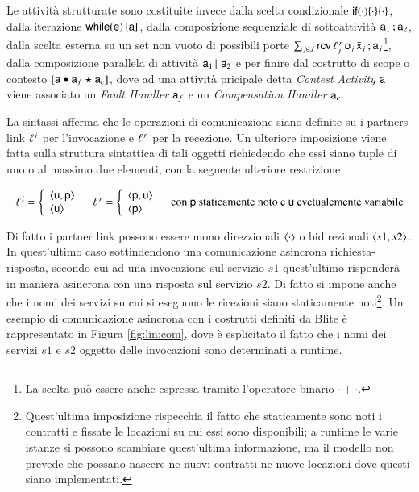 Le attività strutturate sono costituite invece dalla scelta condizionale
${\sf if}(\cdot)\{ \cdot \}\{\cdot\}$, dalla iterazione ${\sf while}({\sf e})\, \{ {\sf a}\}$, dalla
composizione sequenziale di sottoattività ${\sf a}_1\, ;{\sf a}_2$, dalla scelta
esterna su un set non vuoto di possibili porte $\sum_{j \in
J}{\sf rcv}\,\ell^{\,r}_j\, {\sf o}_j\, \bar{{\sf x}}_j\, ;{\sf a}_j$\footnote{La scelta può
essere anche espressa tramite l'operatore binario $ \cdot + \cdot$.}, dalla
composizione parallela di attività ${\sf a}_1\,|\,\, {\sf a}_2$ e per finire dal costrutto di scope o contesto $[{\sf a} \bullet {\sf a}_f \star {\sf a}_c]$, dove ad una attività pricipale
detta \emph{Contest Activity} ${\sf a}$ viene associato un \emph{Fault Handler}
${\sf a}_f$ e un \emph{Compensation Handler} ${\sf a}_c$.

La sintassi afferma che le operazioni di comunicazione siano
definite su i partners link $\ell^{\,i}$ per l'invocazione e $\ell^{\,r}$ per la
recezione. Un ulteriore imposizione viene fatta sulla struttura sintattica di
tali oggetti richiedendo che essi siano tuple di uno o al massimo due elementi,
con la seguente ulteriore restrizione

$$
\begin{array}{ccc}

\plinv = \left\{ 
\begin{array}{l}
 \arr{\xu,\xp}   \\
 \arr{\xu}  
\end{array} \right.

&

\plrec = \left\{ 
\begin{array}{l}
 \arr{\xp,\xu}   \\
 \arr{\xp}  
\end{array} \right.

& \textrm{con } \xp \textrm{ staticamente noto e } \xu \textrm{
evetualemente variabile}

\end{array}
$$

Di fatto i partner link possono essere mono direzzionali $\langle \cdot \rangle$ o
bidirezionali $\langle s1, s2 \rangle$. In quest'ultimo caso sottindendono una
comunicazione asincrona richiesta-risposta, secondo cui ad una invocazione sul servizio $s1$
quest'ultimo risponderà in maniera asincrona con una risposta sul servizio $s2$.
Di fatto si impone anche che i nomi dei servizi su cui si eseguono le ricezioni
siano staticamente noti\footnote{Quest'ultima imposizione rispecchia il
fatto che staticamente sono noti i contratti e fissate le
locazioni su cui essi sono disponibili; a runtime le varie istanze si possono
scambiare quest'ultima informazione, ma il modello non prevede che possano
nascere ne nuovi contratti ne nuove locazioni dove questi siano implementati.}.
Un esempio di comunicazione asincrona con i costrutti definiti da Blite è
rappresentato in Figura \ref{fig:lin:com}, dove è esplicitato il fatto che i
nomi dei servizi $s1$ e $s2$ oggetto delle invocazioni sono determinati a
runtime.

